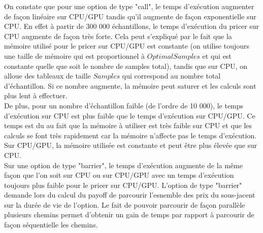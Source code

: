 \documentclass[french,12pt,a4paper]{article}
\begin{document}
On constate que pour une option de type "call", le temps d'exécution augmenter de façon linéaire sur CPU/GPU tandis qu'il augmente de façon exponentielle sur CPU. En effet à partir de 300 000 échantillons, le temps d'exécution du pricer sur CPU augmente de façon très forte. Cela peut s'expliqué par le fait que la mémoire utilisé pour le pricer sur CPU/GPU est constante (on utilise toujours une taille de mémoire qui est proportionnel à $OptimalSamples$ et qui est constante quelle que soit le nombre de samples total), tandis que sur CPU, on alloue des tableaux de taille $Samples$ qui correspond au nombre total d'échantillon. Si ce nombre augmente, la mémoire peut saturer et les calculs sont plus lent à effectuer.\\
De plus, pour un nombre d'échantillon faible (de l'ordre de 10 000), le temps  d'exécution sur CPU est plus faible que le temps d'exécution sur CPU/GPU. Ce temps est du au fait que la mémoire à utiliser est très faible sur CPU et que les calculs se font très rapidement car la mémoire n'affecte pas le temps d'exécution. Sur CPU/GPU, la mémoire utilisée est constante et peut être plus élevée que sur CPU.\\

Sur une option de type "barrier", le temps d'exécution augmente de la même façon que l'on soit sur CPU ou sur CPU/GPU avec un temps d'exécution toujours plus faible pour le pricer sur CPU/GPU. L'option de type "barrier" demande lors du calcul du payoff de parcourir l'esnemble des prix du sous-jacent sur la durée de vie de l'option. Le fait de pouvoir parcourir de façon parallèle plusieurs chemins permet d'obtenir un gain de temps par rapport à parcourir de façon séquentielle les chemins.
\end{document}
